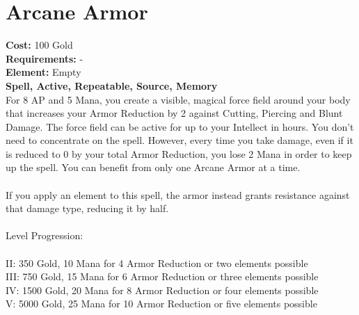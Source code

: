 \section{Arcane Armor}
\textbf{Cost:} 100 Gold\\
\textbf{Requirements:} -\\
\textbf{Element:} Empty\\
\textbf{Spell, Active, Repeatable, Source, Memory}\\
For 8 AP and 5 Mana, you create a visible, magical force field around your body that increases your Armor Reduction by 2 against Cutting, Piercing and Blunt Damage. The force field can be active for up to your Intellect in hours. You don’t need to concentrate on the spell. However, every time you take damage, even if it is reduced to 0 by your total Armor Reduction, you lose 2 Mana in order to keep up the spell. You can benefit from only one Arcane Armor at a time.\\
\\
If you apply an element to this spell, the armor instead grants resistance against that damage type, reducing it by half.\\
\\
Level Progression:\\
\\
II: 350 Gold, 10 Mana for 4 Armor Reduction or two elements possible\\
III: 750 Gold, 15 Mana for 6 Armor Reduction or three elements possible\\
IV: 1500 Gold, 20 Mana for 8 Armor Reduction or four elements possible\\
V: 5000 Gold, 25 Mana for 10 Armor Reduction or five elements possible\\